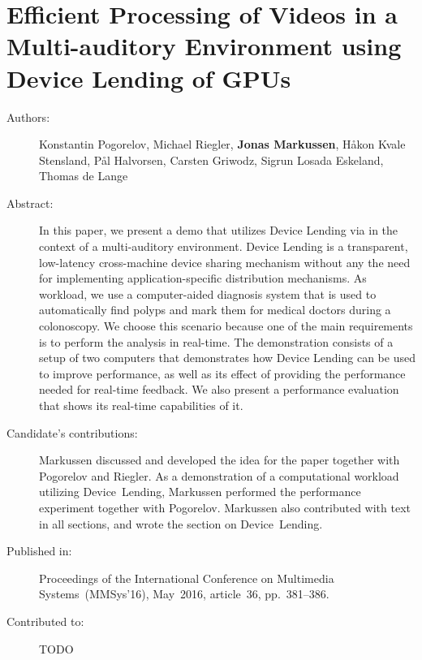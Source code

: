 \chapter{Efficient Processing of Videos in a Multi-auditory Environment using Device Lending of GPUs}
\label{paper:MMSys}
\paperthumb

\begin{description}
	\item[Authors:]
	Konstantin Pogorelov, Michael Riegler, \textbf{Jonas Markussen}, H{\aa}kon Kvale Stensland,
	P{\aa}l Halvorsen, Carsten Griwodz, Sigrun Losada Eskeland, Thomas de Lange


	\item[Abstract:]
		In this paper, we present a demo that utilizes Device Lending 
		via  in the context of a multi-auditory
		environment. Device Lending is a transparent, low-latency
		cross-machine  device sharing mechanism without any
		the need for implementing application-specific distribution
		mechanisms. As workload, we use a computer-aided diagnosis 
		system that is used to automatically find polyps and
		mark them for medical doctors during a colonoscopy. We
		choose this scenario because one of the main requirements
		is to perform the analysis in real-time. The demonstration
		consists of a setup of two computers that demonstrates how
		Device Lending can be used to improve performance, as well
		as its effect of providing the performance needed for 
		real-time feedback. We also present a performance evaluation
		that shows its real-time capabilities of it.


	\item[Candidate's contributions:]
		Markussen discussed and developed the idea for the paper together with Pogorelov and Riegler.
		As a demonstration of a computational workload utilizing Device~Lending,
		Markussen performed the performance experiment together with Pogorelov.
		Markussen also contributed with text in all sections, and wrote the section on Device~Lending.

	\item[Published in:]
	Proceedings of the International Conference on Multimedia Systems~(MMSys'16),
	May~2016, article~36, pp.~381--386.

	\item[Contributed to:]
		TODO

\end{description}
